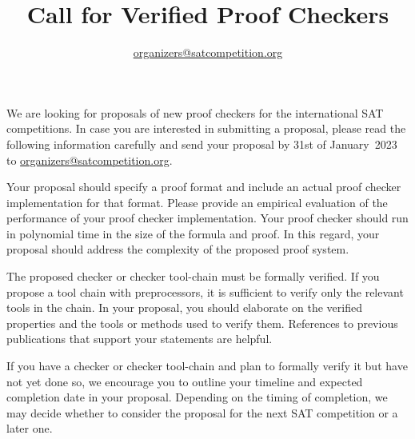 \documentclass{article}
\title{Call for Verified Proof Checkers}
\author{\url{organizers@satcompetition.org}}
\date{}
\begin{document}
\maketitle
\thispagestyle{empty}


We are looking for proposals of new proof checkers for the international SAT competitions.
In case you are interested in submitting a proposal, please read the following information carefully 
and send your proposal by 31st of January~2023 to \url{organizers@satcompetition.org}.
    

    
Your proposal should specify a proof format and include an actual proof checker implementation for that format.
Please provide an empirical evaluation of the performance of your proof checker implementation.
Your proof checker should run in polynomial time in the size of the formula and proof.
In this regard, your proposal should address the complexity of the proposed proof system.
    

    
The proposed checker or checker tool-chain must be formally verified.
If you propose a tool chain with preprocessors, it is sufficient to verify only the relevant tools in the chain.
In your proposal, you should elaborate on the verified properties and the tools or methods used to verify them.
References to previous publications that support your statements are helpful.
    

    
If you have a checker or checker tool-chain and plan to formally verify it but have not yet done so, 
we encourage you to outline your timeline and expected completion date in your proposal.
Depending on the timing of completion, we may decide whether to consider the proposal for the next SAT competition or a later one.   
    
\end{document}
